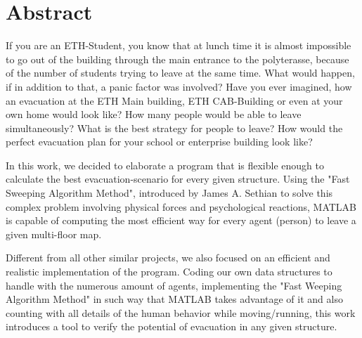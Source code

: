 \documentclass[11pt]{article}
\begin{document}






\tableofcontents

\newpage




\section{Abstract}

If you are an ETH-Student, you know that at lunch time it is almost impossible to go out of the building through the main entrance to the polyterasse, because of the number of students trying to leave at the same time. What would happen, if in addition to that, a panic factor was involved? Have you ever imagined, how an evacuation at the ETH Main building, ETH CAB-Building or even at your own home would look like? How many people would be able to leave simultaneously? What is the best strategy for people to leave? How would the perfect evacuation plan for your school or enterprise building look like?

In this work, we decided to elaborate a program that is flexible enough to calculate the best evacuation-scenario for every given structure. Using the "Fast Sweeping Algorithm Method", introduced by James A. Sethian\cite{Zhao04afast} to solve this complex problem involving physical forces and psychological reactions, MATLAB is capable of computing the most efficient way for every agent (person) to leave a given multi-floor map.

Different from all other similar projects, we also focused on an efficient and realistic implementation of the program. Coding our own data structures to handle with the numerous amount of agents, implementing the "Fast Weeping Algorithm Method" in such way that MATLAB takes advantage of it and also counting with all details of the human behavior while moving/running, this work introduces a tool to verify the potential of evacuation in any given structure.
\end{document}
